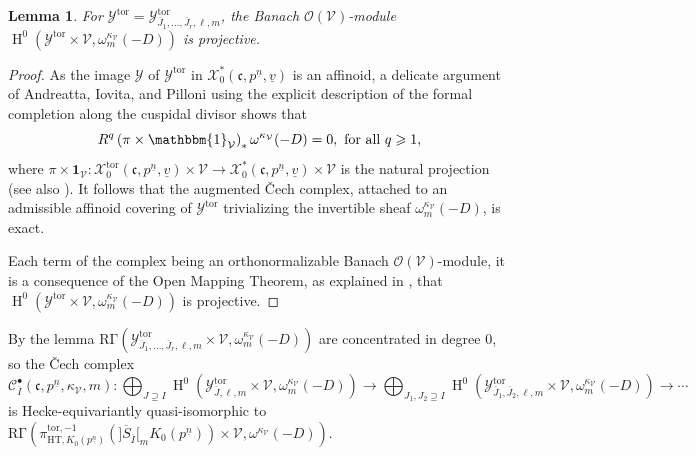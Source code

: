 \documentclass[11pt]{amsart}
\theoremstyle{definition} %
\theoremstyle{plain} %
\newtheorem{lemma}[definition]{Lemma}
\theoremstyle{remark} %
\newcommand{\cC}{{\mathcal C}}
\newcommand{\cO}{{\mathcal O}}
\newcommand{\cV}{{\mathcal V}}
\newcommand{\cX}{{\mathcal X}}
\newcommand{\cY}{{\mathcal Y}}
\newcommand{\frakc}{\mathfrak c}
\newcommand{\HT}{\mathrm{HT}}
\newcommand{\tor}{\mathrm{tor}} %
\newcommand{\RG}{\mathrm{R\Gamma}}
\DeclareMathOperator\rH{H}
\begin{document}
\begin{lemma} \label{lem:projective}
For  $\cY^{\tor}=\cY^{\tor}_{\overline{J}_1,\ldots,\overline{J}_r,\ell,m}$, 
the Banach $\cO(\cV)$-module 
$\rH^0(\cY^{\tor}\times \cV, \omega_m^{\kappa_\cV}(-D))$ is  projective. 
\end{lemma}
\begin{proof}
As the image $\cY$ of $\cY^{\tor}$ in $\cX_0^\ast(\frakc,p^{\underline{n}},\underline{v})$ is an affinoid, a delicate argument of Andreatta, Iovita, and Pilloni \cite[\S3.6]{AIP16}  using the explicit description of the formal completion along the cuspidal divisor shows that 
\[R^q\left(\pi\times \mathbbm{1}_{\cV} \right)_* \omega^{\kappa_\cV}(-D)=0, \text{ for all } q\geqslant 1,\]
where $\pi\times \mathbf{1}_{\cV}\colon \cX_0^\tor(\frakc,p^{\underline{n}},\underline{v})\times \cV \rightarrow \cX_0^\ast(\frakc,p^{\underline{n}},\underline{v})\times \cV $ is the natural projection (see also \cite[Thm.~8.2.1.3]{Lan}). 
It follows that the augmented  \v{C}ech complex, attached to 
an admissible affinoid covering of $\cY^{\tor}$ trivializing the 
invertible sheaf $\omega_m^{\kappa_\cV}(-D)$, is exact. 

Each term of  the complex being an orthonormalizable 
Banach $\cO(\cV)$-module, it is a consequence of the Open Mapping Theorem,  as explained in  \cite{Buz07}, that $\rH^0(\cY^{\tor}\times \cV, \omega_m^{\kappa_\cV}(-D))$ is  projective. 
\end{proof}


By the lemma $\RG(\cY^{\tor}_{\overline{J}_1,\ldots,\overline{J}_r,\ell,m}\times \cV, \omega_m^{\kappa_\cV}(-D))$ are concentrated in degree $0$, so the \v{C}ech complex
\[
\cC_{\overline{I}}^{\bullet}(\frakc,p^{\underline{n}}, \kappa_\cV, m)\colon 
\bigoplus_{J\supseteq I} \rH^0(\cY^{\tor}_{\overline{J},\ell,m}\times \cV, \omega_m^{\kappa_\cV}(-D)) \rightarrow
\bigoplus_{J_1,J_2\supseteq I}\rH^0(\cY^{\tor}_{\overline{J}_1,\overline{J}_2,\ell,m} \times \cV, \omega_m^{\kappa_\cV}(-D)) \rightarrow \cdots
\]
 is Hecke-equivariantly quasi-isomorphic to $\RG(\pi_{\HT, K_0(p^{\underline{n}})}^{\tor,-1}(]\overline{S}_{\overline{I}}[_m K_0(p^{\underline{n}}))\times \cV, \omega^{\kappa_\cV}(-D))$.
\end{document}
